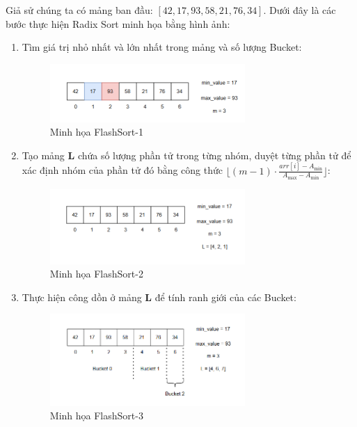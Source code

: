 Giả sử chúng ta có mảng ban đầu: $[42, 17, 93, 58, 21, 76, 34]$. Dưới đây là các bước thực hiện Radix Sort minh họa bằng hình ảnh:

\begin{enumerate}
    \item Tìm giá trị nhỏ nhất và lớn nhất trong mảng và số lượng Bucket:
    \begin{figure}[H]
        \centering
        \includegraphics[width=0.7\textwidth]{img/flash_sort/1.png}
        \caption{Minh họa FlashSort-1}
    \end{figure}
    
    \item Tạo mảng \textbf{L} chứa số lượng phần tử trong từng nhóm, duyệt từng phần tử để xác định nhóm của phần tử đó bằng công thức $\lfloor (m - 1) \cdot \frac{arr[i] - A_{\text{min}}}{A_{\text{max}} - A_{\text{min}}} \rfloor$:
    \begin{figure}[H]
        \centering
        \includegraphics[width=0.7\textwidth]{img/flash_sort/2.png}
        \caption{Minh họa FlashSort-2}
    \end{figure}
    
    \item Thực hiện công dồn ở mảng \textbf{L} để tính ranh giới của các Bucket: 
    \begin{figure}[H]
        \centering
        \includegraphics[width=0.7\textwidth]{img/flash_sort/3.png}
        \caption{Minh họa FlashSort-3}
    \end{figure}
    

\end{enumerate}
